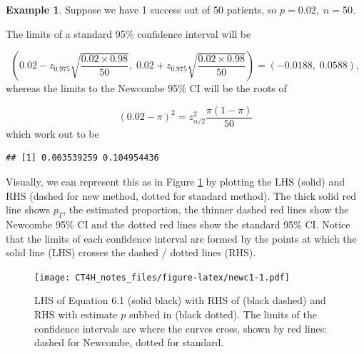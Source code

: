 \documentclass[
  openany]{book}
\theoremstyle{definition}
\theoremstyle{definition}
\newtheorem{example}{Example}[chapter]
\theoremstyle{definition}
\theoremstyle{definition}
\theoremstyle{remark}
\begin{document}
\begin{example}
Suppose we have 1 success out of 50 patients, so \(p=0.02,\;n=50\).

The limits of a standard 95\% confidence interval will be

\[\left(0.02 - z_{0.975}\sqrt{\frac{0.02\times{0.98}}{50}},\; 0.02 + z_{0.975}\sqrt{\frac{0.02\times{0.98}}{50}}\right) = \left(-0.0188,\;0.0588\right),\]
whereas the limits to the Newcombe 95\% CI will be the roots of

\[\left(0.02-\pi\right)^2 = z^2_{\alpha/2}\frac{\pi\left(1-\pi\right)}{50}\]
which work out to be

\begin{verbatim}
## [1] 0.003539259 0.104954436
\end{verbatim}

Visually, we can represent this as in Figure \ref{fig:newc1} by plotting the LHS (solid) and RHS (dashed for new method, dotted for standard method). The thick solid red line shows \(p_T\), the estimated proportion, the thinner dashed red lines show the Newcombe 95\% CI and the dotted red lines show the standard 95\% CI. Notice that the limits of each confidence interval are formed by the points at which the solid line (LHS) crosses the dashed / dotted lines (RHS).
\end{example}

\begin{figure}
\centering
\texttt{[image: CT4H\_notes\_files/figure-latex/newc1-1.pdf]}
\caption{\label{fig:newc1}LHS of Equation 6.1 (solid black) with RHS of (black dashed) and RHS with estimate \(p\) subbed in (black dotted). The limits of the confidence intervals are where the curves cross, shown by red lines: dashed for Newcombe, dotted for standard.}
\end{figure}
\end{document}
